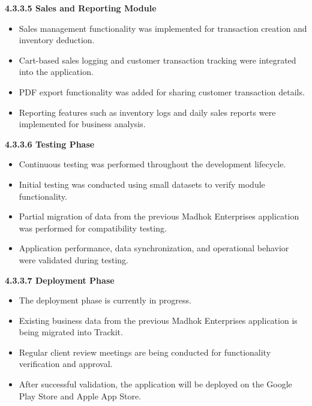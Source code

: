 \documentclass[12pt, oneside]{article}
\begin{document}
\textbf{4.3.3.5 Sales and Reporting Module}

\begin{itemize}
    \item Sales management functionality was implemented for transaction creation and inventory deduction.
    
    \item Cart-based sales logging and customer transaction tracking were integrated into the application.
    
    \item PDF export functionality was added for sharing customer transaction details.
    
    \item Reporting features such as inventory logs and daily sales reports were implemented for business analysis.
\end{itemize}

\textbf{4.3.3.6 Testing Phase}

\begin{itemize}
    \item Continuous testing was performed throughout the development lifecycle.
    
    \item Initial testing was conducted using small datasets to verify module functionality.
    
    \item Partial migration of data from the previous Madhok Enterprises application was performed for compatibility testing.
    
    \item Application performance, data synchronization, and operational behavior were validated during testing.
\end{itemize}

\textbf{4.3.3.7 Deployment Phase}

\begin{itemize}
    \item The deployment phase is currently in progress.
    
    \item Existing business data from the previous Madhok Enterprises application is being migrated into Trackit.
    
    \item Regular client review meetings are being conducted for functionality verification and approval.
    
    \item After successful validation, the application will be deployed on the Google Play Store and Apple App Store.
\end{itemize}
\end{document}
